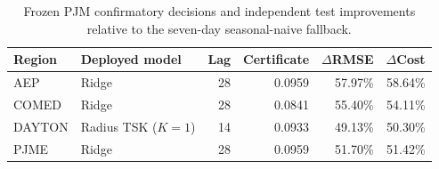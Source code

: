 \begin{table}[t]
\centering
\caption{Frozen PJM confirmatory decisions and independent test improvements relative to the seven-day seasonal-naive fallback.}
\label{tab:pjm_confirmatory_decisions}
\begin{tabular}{llrrrr}
\hline
Region & Deployed model & Lag & Certificate & $\Delta$RMSE & $\Delta$Cost \\
\hline
AEP & Ridge & 28 & 0.0959 & 57.97\% & 58.64\% \\
COMED & Ridge & 28 & 0.0841 & 55.40\% & 54.11\% \\
DAYTON & Radius TSK ($K=1$) & 14 & 0.0933 & 49.13\% & 50.30\% \\
PJME & Ridge & 28 & 0.0959 & 51.70\% & 51.42\% \\
\hline
\end{tabular}
\end{table}
